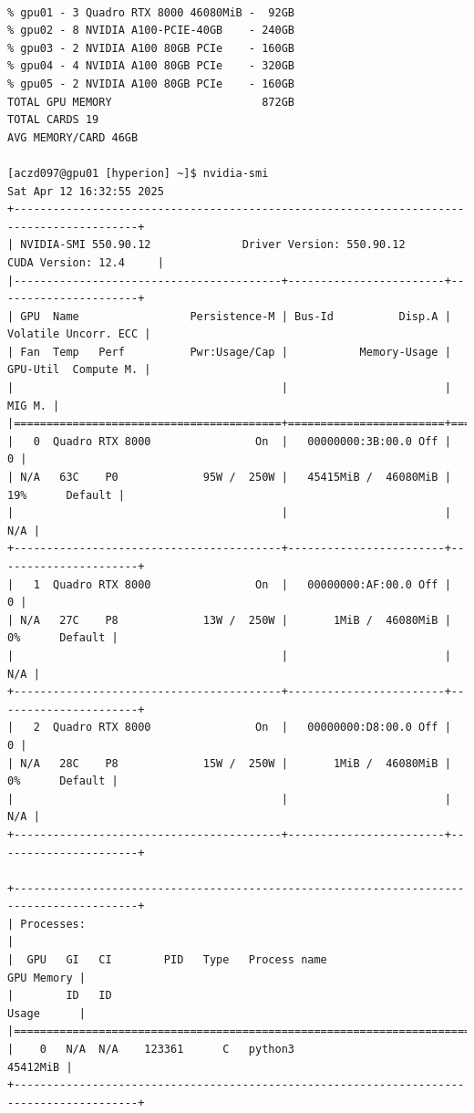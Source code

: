 \begin{verbatim}

% gpu01 - 3 Quadro RTX 8000 46080MiB -  92GB
% gpu02 - 8 NVIDIA A100-PCIE-40GB    - 240GB
% gpu03 - 2 NVIDIA A100 80GB PCIe    - 160GB
% gpu04 - 4 NVIDIA A100 80GB PCIe    - 320GB 
% gpu05 - 2 NVIDIA A100 80GB PCIe    - 160GB
TOTAL GPU MEMORY                       872GB  
TOTAL CARDS 19
AVG MEMORY/CARD 46GB

[aczd097@gpu01 [hyperion] ~]$ nvidia-smi
Sat Apr 12 16:32:55 2025       
+-----------------------------------------------------------------------------------------+
| NVIDIA-SMI 550.90.12              Driver Version: 550.90.12      CUDA Version: 12.4     |
|-----------------------------------------+------------------------+----------------------+
| GPU  Name                 Persistence-M | Bus-Id          Disp.A | Volatile Uncorr. ECC |
| Fan  Temp   Perf          Pwr:Usage/Cap |           Memory-Usage | GPU-Util  Compute M. |
|                                         |                        |               MIG M. |
|=========================================+========================+======================|
|   0  Quadro RTX 8000                On  |   00000000:3B:00.0 Off |                    0 |
| N/A   63C    P0             95W /  250W |   45415MiB /  46080MiB |     19%      Default |
|                                         |                        |                  N/A |
+-----------------------------------------+------------------------+----------------------+
|   1  Quadro RTX 8000                On  |   00000000:AF:00.0 Off |                    0 |
| N/A   27C    P8             13W /  250W |       1MiB /  46080MiB |      0%      Default |
|                                         |                        |                  N/A |
+-----------------------------------------+------------------------+----------------------+
|   2  Quadro RTX 8000                On  |   00000000:D8:00.0 Off |                    0 |
| N/A   28C    P8             15W /  250W |       1MiB /  46080MiB |      0%      Default |
|                                         |                        |                  N/A |
+-----------------------------------------+------------------------+----------------------+
                                                                                         
+-----------------------------------------------------------------------------------------+
| Processes:                                                                              |
|  GPU   GI   CI        PID   Type   Process name                              GPU Memory |
|        ID   ID                                                               Usage      |
|=========================================================================================|
|    0   N/A  N/A    123361      C   python3                                     45412MiB |
+-----------------------------------------------------------------------------------------+


\end{verbatim}
